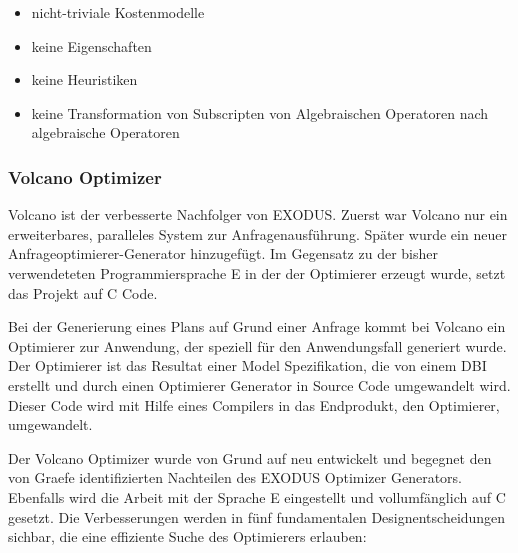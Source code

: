 \begin{itemize}
\item nicht-triviale Kostenmodelle
\item keine Eigenschaften
\item keine Heuristiken
\item keine Transformation von Subscripten von Algebraischen Operatoren nach algebraische Operatoren
\end{itemize}


\subsubsection{Volcano Optimizer}

Volcano ist der verbesserte Nachfolger von EXODUS. Zuerst war Volcano nur ein erweiterbares, paralleles System zur Anfragenausführung. Später wurde ein neuer Anfrageoptimierer-Generator hinzugefügt. Im Gegensatz zu der bisher verwendeteten Programmiersprache E in der der Optimierer erzeugt wurde, setzt das Projekt auf C Code. 


Bei der Generierung eines Plans auf Grund einer Anfrage kommt bei Volcano ein Optimierer zur Anwendung, der speziell für den Anwendungsfall generiert wurde. Der Optimierer ist das Resultat einer Model Spezifikation, die von einem \ac{DBI} erstellt und durch einen Optimierer Generator in Source Code umgewandelt wird. Dieser Code wird mit Hilfe eines Compilers in das Endprodukt, den Optimierer, umgewandelt.


Der Volcano Optimizer wurde von Grund auf neu entwickelt und begegnet den von Graefe identifizierten Nachteilen des EXODUS Optimizer Generators. Ebenfalls wird die Arbeit mit der Sprache E eingestellt und vollumfänglich auf C gesetzt. Die Verbesserungen werden in fünf fundamentalen Designentscheidungen\cite{graefe1993volcano} sichbar, die eine effiziente Suche des Optimierers erlauben:


